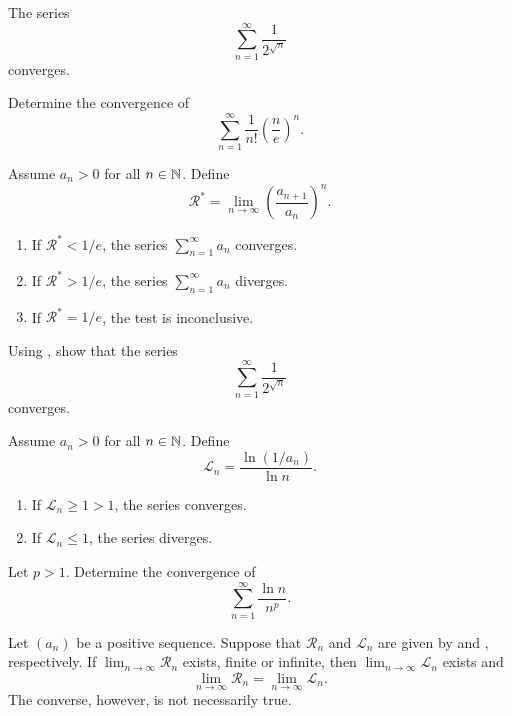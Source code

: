 \begin{example}
  The series
  \[ \sum_{n = 1}^{\infty} \frac{1}{2^{\sqrt{n}}} \]
  converges.
\end{example}

\begin{example}
  Determine the convergence of
  \[ \sum_{n = 1}^{\infty} \frac{1}{n!} \left(\frac{n}{e}\right)^n. \]
\end{example}

\begin{proposition}
  Assume $a_n > 0$ for all $n \in \mathbb N$. Define
  \[ \mathcal{R}^\ast = \lim_{n \to \infty} \left(\frac{a_{n +
  1}}{a_n}\right)^n. \]
  \begin{enumerate}
    \item If $\mathcal{R}^\ast < 1/e$, the series $\sum_{n = 1}^{\infty}
      a_n$ converges.
    \item If $\mathcal{R}^\ast > 1/e$, the series $\sum_{n =
      1}^{\infty} a_n$ diverges.
    \item If $\mathcal{R}^\ast = 1/e$, the test is inconclusive.
  \end{enumerate}
\end{proposition}

\begin{example}
  Using , show that the series
  \[ \sum_{n = 1}^{\infty} \frac{1}{2^{\sqrt{n}}} \]
  converges.
\end{example}

\begin{proposition}
  Assume $a_n > 0$ for all $n \in \mathbb N$. Define
  \[ \mathcal{L}_n = \frac{\ln(1/a_n)}{\ln n}. \]
  \begin{enumerate}
    \item If $\mathcal{L}_n \geq 1 > 1$, the series converges.
    \item If $\mathcal{L}_n \leq 1$, the series diverges.
  \end{enumerate}
\end{proposition}

\begin{example}
  Let $p > 1$. Determine the convergence of
  \[ \sum_{n = 1}^{\infty} \frac{\ln n}{n^p}. \]
\end{example}

\begin{proposition}
  Let $(a_n)$ be a positive sequence. Suppose that $\mathcal{R}_n$
  and $\mathcal{L}_n$ are given by  and
  , respectively. If $\lim_{n \to \infty}
  \mathcal{R}_n$ exists, finite or infinite, then $\lim_{n \to
  \infty} \mathcal{L}_n$ exists and
  \[ \lim_{n \to \infty} \mathcal{R}_n = \lim_{n \to \infty} \mathcal{L}_n. \]
  The converse, however, is not necessarily true.
\end{proposition}

